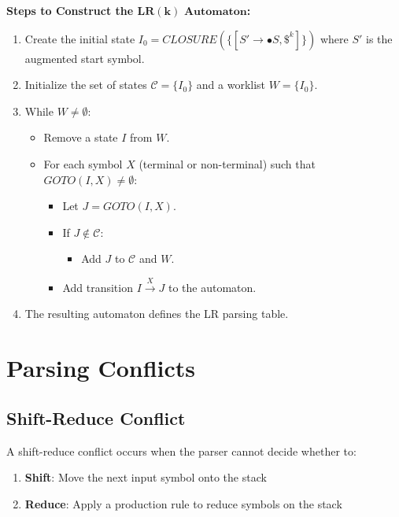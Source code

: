 \textbf{Steps to Construct the $\mathbf{LR(k) \text{ Automaton}}$:}
\begin{enumerate}
    \item Create the initial state $I_0 = CLOSURE(\{[S' \to \bullet S, \$^k]\})$ where $S'$ is the augmented start symbol.
    
    \item Initialize the set of states $\mathcal{C} = \{I_0\}$ and a worklist $W = \{I_0\}$.
    
    \item While $W \neq \emptyset$:
    \begin{itemize}
        \item Remove a state $I$ from $W$.
        \item For each symbol $X$ (terminal or non-terminal) such that $GOTO(I, X) \neq \emptyset$:
        \begin{itemize}
            \item Let $J = GOTO(I, X)$.
            \item If $J \notin \mathcal{C}$:
            \begin{itemize}
                \item Add $J$ to $\mathcal{C}$ and $W$.
            \end{itemize}
            \item Add transition $I \xrightarrow{X} J$ to the automaton.
        \end{itemize}
    \end{itemize}
    
    \item The resulting automaton defines the LR parsing table.
\end{enumerate}




\section{Parsing Conflicts}

\subsection{Shift-Reduce Conflict}

A shift-reduce conflict occurs when the parser cannot decide whether to:
\begin{enumerate}
    \item \textbf{Shift}: Move the next input symbol onto the stack
    \item \textbf{Reduce}: Apply a production rule to reduce symbols on the stack
\end{enumerate}

